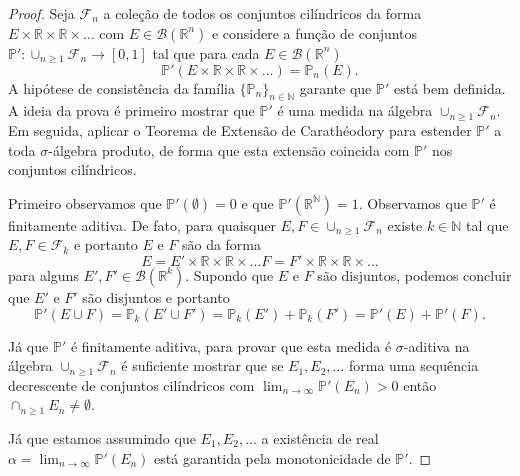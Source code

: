 \begin{proof}
Seja $\mathcal{F}_n$ 
a coleção de todos os conjuntos cilíndricos da 
forma $E\times\mathbb{R}\times\mathbb{R}\times\ldots$
com $E\in\mathscr{B}(\mathbb{R}^n)$
e considere a função de conjuntos 
$\mathbb{P}':\cup_{n\geq 1}\mathcal{F}_n\to [0,1]$
tal que para cada $E\in\mathscr{B}(\mathbb{R}^n)$ 
\[
\mathbb{P}'(E\times\mathbb{R}\times\mathbb{R}\times\ldots)
=
\mathbb{P}_n(E).
\] 
A hipótese de consistência da família $\{\mathbb{P}_n\}_{n\in\mathbb{N}}$
garante que $\mathbb{P}'$ está bem definida. 
A ideia da prova é primeiro mostrar que $\mathbb{P}'$ é uma medida na álgebra 
$\cup_{n\geq 1}\mathcal{F}_n$. Em seguida, aplicar o 
Teorema de Extensão de Carathéodory para estender $\mathbb{P}'$
a toda $\sigma$-álgebra produto, de forma que esta 
extensão coincida com $\mathbb{P}'$ 
nos conjuntos cilíndricos.

Primeiro observamos que $\mathbb{P}'(\emptyset)=0$ 
e que $\mathbb{P}'(\mathbb{R}^{\mathbb{N}})=1$.
Observamos que $\mathbb{P}'$ é finitamente aditiva.
De fato, para quaisquer $E,F\in \cup_{n\geq 1}\mathcal{F}_n$ 
existe $k\in\mathbb{N}$ tal que $E,F\in \mathcal{F}_{k}$
e portanto $E$ e $F$ são da forma 
\[
E= E'\times\mathbb{R}\times\mathbb{R}\times\ldots
F= F'\times\mathbb{R}\times\mathbb{R}\times\ldots
\]
para alguns $E',F'\in\mathscr{B}(\mathbb{R}^k)$.
Supondo que $E$ e $F$ são disjuntos, podemos concluir que
$E'$ e $F'$ são disjuntos e portanto 
\[
\mathbb{P}'(E\cup F)
=
\mathbb{P}_{k}(E'\cup F')
=
\mathbb{P}_{k}(E')+\mathbb{P}_{k}(F')
=
\mathbb{P}'(E)+\mathbb{P}'(F).
\]

Já que $\mathbb{P}'$ é finitamente aditiva, para provar 
que esta medida é $\sigma$-aditiva na álgebra 
$\cup_{n\geq 1}\mathcal{F}_n$ é suficiente mostrar que 
se $E_1,E_2,\ldots $ forma uma sequência decrescente de 
conjuntos cilíndricos com 
$\lim_{n\to\infty}\mathbb{P}'(E_n)>0$ então 
$\cap_{n\geq 1}E_n \neq \emptyset$.


Já que estamos assumindo que 
$E_1,E_2,\ldots $ a existência de 
real  $\alpha= \lim_{n\to\infty}\mathbb{P}'(E_n)$
está garantida pela monotonicidade de $\mathbb{P}'$.


\end{proof}
